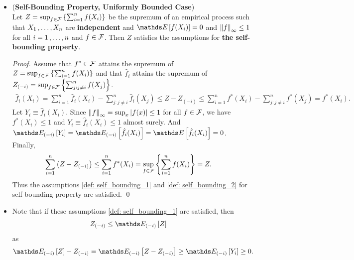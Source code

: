 \documentclass[11pt]{article}
\begin{document}
\begin{itemize}
\item \begin{proposition}(\textbf{Self-Bounding Property, Uniformly Bounded Case})\citep{boucheron2013concentration}\\
Let $Z =  \sup_{f \in {\mathcal F}}\left\{\sum_{i=1}^n f(X_i)\right\}$  be the supremum of an empirical process such that $X_1 \,{,}\ldots{,}\, X_n$ are \textbf{independent} and $\E{}{f(X_i)} =0$  and $\left\|f\right\|_{\infty} \le 1$ for all $i = 1 \,{,}\ldots{,}\, n$ and $f \in {\mathcal F}$. Then $Z$ satisfies the assumptions for \textbf{the self-bounding property}.
\end{proposition}
\begin{proof}
Assume that $f^{*} \in {\mathcal F}$ attains the supremum of $Z =  \sup_{f \in {\mathcal F}}\left\{\sum_{i=1}^n f(X_i)\right\}$ and that  $\hat{f}_i$ attains the supremum of $Z_{(-i)} = \sup_{f \in {\mathcal F}}\left\{\sum_{j: j\neq i}^n f(X_j)\right\}$.
\begin{align*}
\hat{f}_i(X_i) = \sum_{i=1}^n \hat{f}_i(X_i) - \sum_{j: j\neq i}^n \hat{f}_i(X_j)  \le Z - Z_{(-i)} \le \sum_{i=1}^n f^{*}(X_i) - \sum_{j: j\neq i}^n f^{*}(X_j) = f^{*}(X_i).
\end{align*} Let  $Y_i \equiv \hat{f}_i(X_i)$. Since $\left\|f\right\|_{\infty} = \sup_{x} \left\lvert f(x) \right\rvert \le 1$ for all $f \in {\mathcal F}$, we have $f^{*}(X_i) \le 1$ and $Y_i \equiv \hat{f}_i(X_i) \le 1$ almost surely. And $\E{(-i)}{Y_i} = \E{(-i)}{\hat{f}_i(X_i) } = \E{}{\hat{f}_i(X_i)} = 0$. Finally, 
\begin{align*}
\sum_{i=1}^n\left(Z - Z_{(-i)}\right) &\le \sum_{i=1}^n f^{*}(X_i) = \sup_{f \in {\mathcal F}}\left\{\sum_{i=1}^n f(X_i)\right\} = Z.
\end{align*} Thus the assumptions  \eqref{def: self_bounding_1} and \eqref{def: self_bounding_2} for self-bounding property are satisfied. \qed
\end{proof}

\item \begin{remark}
Note that if these assumptions  \eqref{def: self_bounding_1}  are satisfied, then
\begin{align*}
Z_{(-i)} &\le \E{(-i)}{Z}
\end{align*} as
\begin{align*}
 \E{(-i)}{Z} - Z_{(-i)} =  \E{(-i)}{Z - Z_{(-i)}} \ge   \E{(-i)}{Y_i}  \ge 0.
\end{align*}
\end{remark}


\end{itemize}
\end{document}
